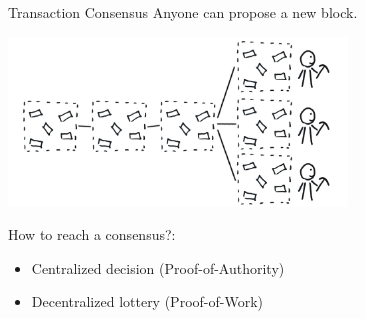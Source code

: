 \documentclass[]{beamer}
\begin{document}
\begin{frame}{Transaction Consensus}
Anyone can propose a new block. \\ \vspace{1.5em}


\includegraphics[width=9cm]{../assets/images/consensus_problem.png}

How to reach a consensus?: \\
	\begin{itemize}
	\item Centralized decision (Proof-of-Authority)
	\item \color{focus}Decentralized lottery (Proof-of-Work)
	\end{itemize} 
\end{frame}
\end{document}
